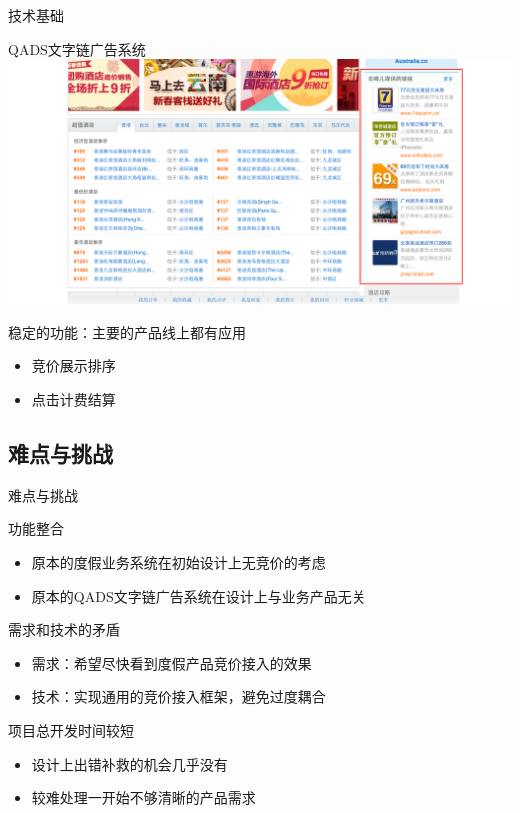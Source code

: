 \documentclass{beamer}
\begin{document}
\begin{CJK}{UTF8}{gbsn}
\begin{frame}{技术基础}
\begin{block}{QADS文字链广告系统}
  \includegraphics[scale=0.23]{./imgs/qads-demo}
  \pause
\end{block}
\begin{block}{稳定的功能：主要的产品线上都有应用}
  \begin{itemize}
    \item {
      竞价展示排序 
    }
    \item {
      点击计费结算 
    }
  \end{itemize}
\end{block}
\end{frame}

\subsection{难点与挑战}

\begin{frame}{难点与挑战}
  \begin{block}{功能整合}
    \begin{itemize}
      \item {
        原本的度假业务系统在初始设计上无竞价的考虑
      }
      \item {
        原本的QADS文字链广告系统在设计上与业务产品无关
      }
    \end{itemize}
    \pause
  \end{block}
  \begin{block}{需求和技术的矛盾}
    \begin{itemize}
    \item {
      需求：希望尽快看到度假产品竞价接入的效果
    }
    \item {
      技术：实现通用的竞价接入框架，避免过度耦合
    }
    \end{itemize}
    \pause
  \end{block}
  \begin{block}{项目总开发时间较短}
    \begin{itemize}
      \item {
        设计上出错补救的机会几乎没有
      }
      \item {
        较难处理一开始不够清晰的产品需求
      }
    \end{itemize}
  \end{block}
\end{frame}


\end{CJK}
\end{document}
